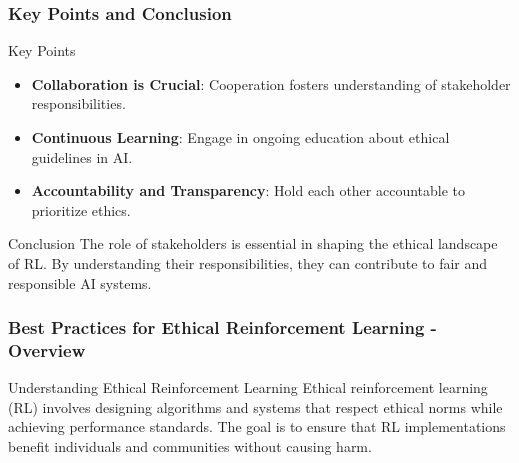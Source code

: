 \documentclass[aspectratio=169]{beamer}
\begin{document}
\begin{frame}[fragile]
    \frametitle{Key Points and Conclusion}
    \begin{block}{Key Points}
        \begin{itemize}
            \item \textbf{Collaboration is Crucial}: Cooperation fosters understanding of stakeholder responsibilities.
            \item \textbf{Continuous Learning}: Engage in ongoing education about ethical guidelines in AI.
            \item \textbf{Accountability and Transparency}: Hold each other accountable to prioritize ethics.
        \end{itemize}
    \end{block}

    \begin{block}{Conclusion}
        The role of stakeholders is essential in shaping the ethical landscape of RL. By understanding their responsibilities, they can contribute to fair and responsible AI systems.
    \end{block}
\end{frame}

\begin{frame}[fragile]
    \frametitle{Best Practices for Ethical Reinforcement Learning - Overview}
    \begin{block}{Understanding Ethical Reinforcement Learning}
        Ethical reinforcement learning (RL) involves designing algorithms and systems that respect ethical norms while achieving performance standards. The goal is to ensure that RL implementations benefit individuals and communities without causing harm.
    \end{block}
\end{frame}
\end{document}
